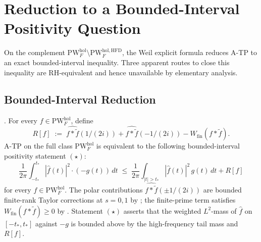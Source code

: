 \section{Reduction to a Bounded-Interval Positivity Question}
\label{v4-arith:w6-a:bounded-interval}

On the complement
\(\mathrm{PW}^{\mathrm{hol}}_{F}\setminus\mathrm{PW}^{\mathrm{hol},\mathrm{HFD}}_{F}\),
the Weil explicit formula reduces A-TP to an exact bounded-interval
inequality. Three apparent routes to close this inequality are
RH-equivalent and hence unavailable by elementary analysis.

\subsection{Bounded-Interval Reduction}
\label{v4-arith:w6-a:bounded-interval:reduction}

\begin{theorem}
\label{v4-arith:w6-a:thm:bounded-reduction}
\ClaimStatusProvedHere. For every \(f\in\mathrm{PW}^{\mathrm{hol}}_{F}\),
define
\begin{equation}
\label{v4-arith:w6-a:eq:R-definition}
R[f]\;:=\;\widehat{f*\widetilde{f}}(1/(2i))+\widehat{f*\widetilde{f}}(-1/(2i))-W_{\mathrm{fin}}(f*\widetilde{f}).
\end{equation}
A-TP on the full class \(\mathrm{PW}^{\mathrm{hol}}_{F}\) is equivalent
to the following bounded-interval positivity statement \((\star)\):
\begin{equation}
\label{v4-arith:w6-a:eq:bounded-reduction-star}
\frac{1}{2\pi}\!\int_{-t_{\ast}}^{t_{\ast}}\!|\widehat{f}(t)|^{2}\cdot(-g(t))\,dt
\;\leq\;
\frac{1}{2\pi}\!\int_{|t|>t_{\ast}}\!|\widehat{f}(t)|^{2}\,g(t)\,dt+R[f]
\tag{\(\star\)}
\end{equation}
for every \(f\in\mathrm{PW}^{\mathrm{hol}}_{F}\). The polar
contributions \(\widehat{f*\widetilde{f}}(\pm 1/(2i))\) are bounded
finite-rank Taylor corrections at \(s=0,1\) by
; the finite-prime term satisfies
\(W_{\mathrm{fin}}(f*\widetilde{f})\geq 0\) by
. Statement \((\star)\) asserts
that the weighted \(L^{2}\)-mass of \(\widehat{f}\) on
\([-t_{\ast},t_{\ast}]\) against \(-g\) is bounded above by the
high-frequency tail mass and \(R[f]\).
\end{theorem}

